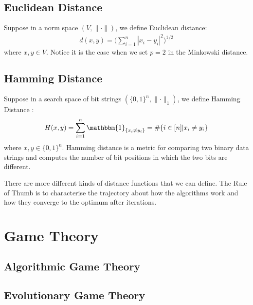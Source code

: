 \documentclass[a4paper,11pt]{report}
\theoremstyle{plain} %
\theoremstyle{definition} %
\theoremstyle{remark} %
\begin{document}
\subsection{Euclidean Distance}
\par Suppose in a norm space $(V,\lVert \cdot \rVert)$, we define Euclidean distance:
\begin{align*}
    d(x,y) = \big( \sum_{i=1}^n |x_{i} - y_{i}|^2  \big)^{1/2}
\end{align*}
where $x,y \in V$.  Notice it is the case when we set $p=2$ in the Minkowski distance.

\subsection{Hamming Distance}
\par Suppose in a search space of bit strings $(\{0,1\}^n,\lVert \cdot \rVert_{1})$, we define Hamming Distance \citep{doerr2019theory}:
\begin{align*}
    H(x,y) = \sum_{i=1}^n \mathbbm{1}_{ \{x_{i}\neq y_{i} \} }=\# \{i\in [n] | x_{i}\neq y_{i}  \} 
\end{align*}
where $x,y \in \{0,1\}^n$.  Hamming distance is a metric for comparing two binary data strings and computes the number of bit positions in which the two bits are different.

\par There are more different kinds of distance functions that we can define. The Rule of Thumb is to characterise the trajectory about how the algorithms work and how they converge to the optimum after iterations.  

\section{Game Theory}

\subsection{Algorithmic Game Theory}

\subsection{Evolutionary Game Theory}




\end{document}
